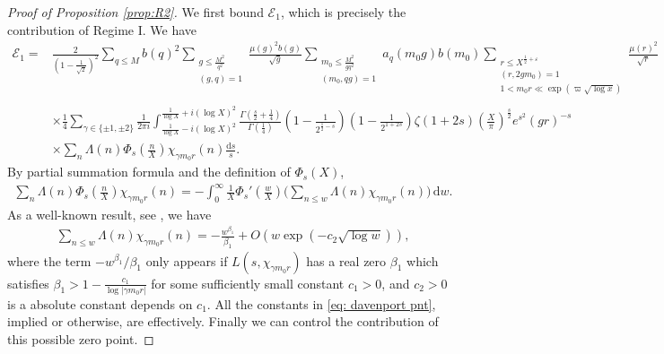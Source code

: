 \documentclass[12pt,reqno]{amsart}
\numberwithin{equation}{section}
\theoremstyle{plain}
\theoremstyle{definition}
\theoremstyle{remark}
\newcommand{\dd}{\mathrm{d}}
\begin{document}
\begin{proof}[Proof of Proposition \ref{prop:R2}]
We first bound $\mathcal{E}_1$, which is precisely the contribution of Regime I. We have
\begin{equation}\label{eq: Reg1 defn of E1}
  \begin{split}
  \mathcal{E}_1=&\frac{2}{\left( 1-\frac{1}{\sqrt{2}}\right)^2} \sum_{q\leq M} b(q)^2 \sum_{\substack{g\leq \frac{M^2}{q^2}\\ (g,q)=1}} \frac{{\mu (g)}^2b(g)}{ \sqrt{g}} \sum_{\substack{m_0 \leq \frac{M^2}{gq^2} \\ (m_0,qg)=1}} a_q(m_0g)b(m_0) \sum_{\substack{r \leq X^{\frac{1}{2}+\varepsilon } \\ (r,2gm_0)=1 \\ 1<m_0r\ll \exp(\varpi \sqrt{\log x}) \\ }}
   \frac{{\mu (r)}^2}{ \sqrt{r}}   \\
  &\times \frac{1}{4} \sum_{\gamma \in \{\pm 1, \pm 2\}} \frac{1}{2\pi i} \int_{\frac{1}{\log X}-i(\log X)^2}^{\frac{1}{\log X}+i(\log X)^2} \frac{\Gamma(\frac{s}{2}+\frac{1}{4})}{\Gamma(\frac{1}{4})} \left( 1-\frac{1}{2^{\frac{1}{2}-s}}\right)\left(1 - \frac{1}{2^{1+2s}}\right)\zeta(1+2s)\left(\frac{X}{\pi}\right)^{\frac{s}{2}}e^{s^2} \left( gr\right)^{-s} \\
  &\times \sum_{n} \Lambda (n) \Phi_s\left(\frac{n}{X}\right)  \chi_{\gamma m_0 r}(n) \frac{\dd s}{s}.
  \end{split}
\end{equation}
By partial summation formula and the definition of $\Phi_s \left( X\right)$,
\begin{equation}\label{eq:  partial summation before pnt}
  \begin{split}
  \sum_n \Lambda(n) \Phi_s \left( \frac{n}{X}\right) \chi_{\gamma m_0r}(n)
  = -\int_0^{\infty} \frac{1}{X}\Phi_s'\left(\frac{w}{X}\right) \Bigg(\sum_{n\leq w}\Lambda(n) \chi_{\gamma m_0r}(n)\Bigg) \,\dd w.
  \end{split}
\end{equation}
As a well-known result, see \cite[equation (8) of Chapter 20]{Da00}, we have
\begin{align}\label{eq:  davenport pnt}
  \sum_{n\leq w}\Lambda(n) \chi_{\gamma m_0r}(n) = -\frac{w^{\beta_1}}{\beta_1} +O\left(w \exp(-c_2 \sqrt{\log w}) \right),
  \end{align}
  where the term $-w^{\beta_1}/\beta_1$ only appears if $L(s,\chi_{\gamma m_0r})$ has a real zero $\beta_1$ which satisfies $\beta_1 > 1- \frac{c_1}{\log |\gamma m_0r|}$ for some sufficiently small constant $c_1>0$, and $c_2>0$ is a absolute constant depends on $c_1$.
  All the constants in \eqref{eq:  davenport pnt}, implied or otherwise, are effectively.
  Finally we can control the contribution of this possible zero point.


\end{proof}
\end{document}
